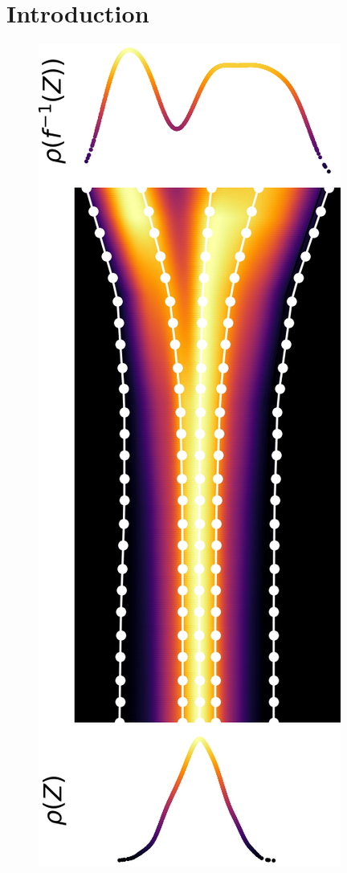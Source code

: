 \documentclass{article}
\theoremstyle{remark}
\theoremstyle{plain}
\begin{document}
\section{Introduction}
\begin{figure}
\vspace{-32pt}
    \centering
    \begin{minipage}{0.36\linewidth}
      \includegraphics[width=\linewidth]{JKOFlow_1D_transition_ZtoX.png}

\end{minipage}
\end{figure}
\end{document}

